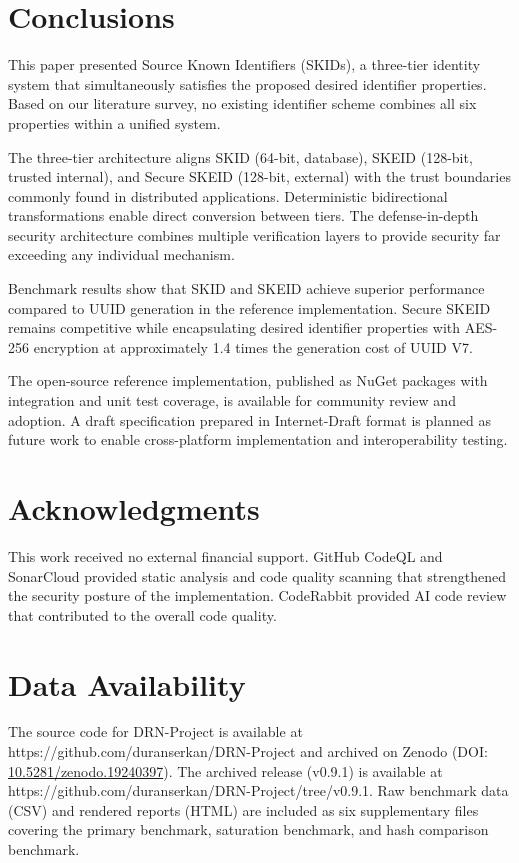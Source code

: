 \documentclass[fleqn,10pt]{wlpeerj}
\begin{document}
\section{Conclusions}\label{conclusions}

This paper presented Source Known Identifiers (SKIDs), a three-tier
identity system that simultaneously satisfies the proposed desired
identifier properties. Based on our literature survey, no existing
identifier scheme combines all six properties within a unified system.

The three-tier architecture aligns SKID (64-bit, database), SKEID
(128-bit, trusted internal), and Secure SKEID (128-bit, external) with
the trust boundaries commonly found in distributed applications.
Deterministic bidirectional transformations enable direct conversion
between tiers. The defense-in-depth security architecture combines
multiple verification layers to provide security far exceeding any
individual mechanism.

Benchmark results show that SKID and SKEID achieve superior performance
compared to UUID generation in the reference implementation. Secure
SKEID remains competitive while encapsulating desired identifier
properties with AES-256 encryption at approximately 1.4 times the
generation cost of UUID V7.

The open-source reference implementation, published as NuGet packages
with integration and unit test coverage, is available for community
review and adoption. A draft specification prepared in Internet-Draft
format is planned as future work to enable cross-platform implementation
and interoperability testing.

\section{Acknowledgments}\label{acknowledgments}

This work received no external financial support. GitHub CodeQL and
SonarCloud provided static analysis and code quality scanning that
strengthened the security posture of the implementation. CodeRabbit
provided AI code review that contributed to the overall code quality.

\section{Data Availability}\label{data-availability}

The source code for DRN-Project is available at
https://github.com/duranserkan/DRN-Project and archived on Zenodo (DOI:
\href{https://doi.org/10.5281/zenodo.19240397}{10.5281/zenodo.19240397}).
The archived release (v0.9.1) is available at
https://github.com/duranserkan/DRN-Project/tree/v0.9.1. Raw benchmark
data (CSV) and rendered reports (HTML) are included as six supplementary
files covering the primary benchmark, saturation benchmark, and hash
comparison benchmark.
\end{document}
